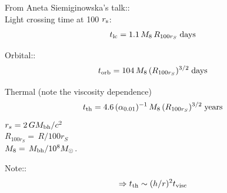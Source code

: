 \documentclass[11pt]{article}
\begin{document}
\medskip \medskip
\noindent
From Aneta Siemiginowska's talk::\\
Light crossing time at 100 $r_{\rm s}$:
\begin{equation}
    t_{\rm lc} = 1.1 \,  M_{8} \, R_{100 r_{S}}  \; {\rm days}
\end{equation}

\noindent
Orbital::
\begin{equation}
  t_{\rm orb} = 104 \, M_{8} \,  (R_{100r_{S}})^{3/2} \;  {\rm days}
\end{equation}

\noindent
Thermal (note the viscosity dependence)
\begin{equation}
  t_{\rm th} = 4.6 \, (\alpha_{0.01})^{-1} \, M_{8}\, (R_{100r_{S}} )^{3/2}  \; {\rm years}
\end{equation}
$r_{s} = 2 \,  GM_{\rm bh}/c^{2}$ \\ 
$R_{100r_{S}} = \, R / 100 r_{S}$  \\
$M_{8} = \,  M_{\rm bh} /10^{8} M_{\odot}$.

\medskip
\noindent
Note:: 
\begin{equation}
  \Rightarrow t_{\rm th} \sim (h/r)^{2} t_{\rm visc}
\end{equation}


\newpage
\end{document}
